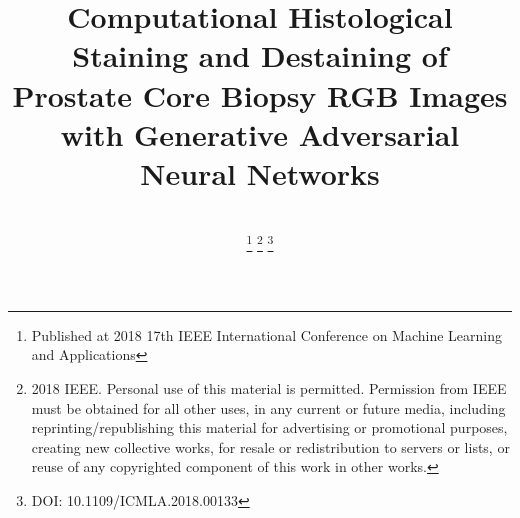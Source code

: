 \documentclass[10pt, conference, compsocconf]{IEEEtran}
\begin{document}
\IEEEoverridecommandlockouts
%
\title{Computational Histological Staining and Destaining of Prostate Core Biopsy RGB Images with Generative Adversarial Neural Networks}



\author{ \\
\thanks{Published at 2018 17th IEEE International Conference on Machine Learning and Applications}
\thanks{ 2018 IEEE.  Personal use of this material is permitted.  Permission from IEEE must be obtained for all other uses, in any current or future media, including reprinting/republishing this material for advertising or promotional purposes, creating new collective works, for resale or redistribution to servers or lists, or reuse of any copyrighted component of this work in other works.}
\thanks{DOI: 10.1109/ICMLA.2018.00133}
}


%
%
\end{document}
